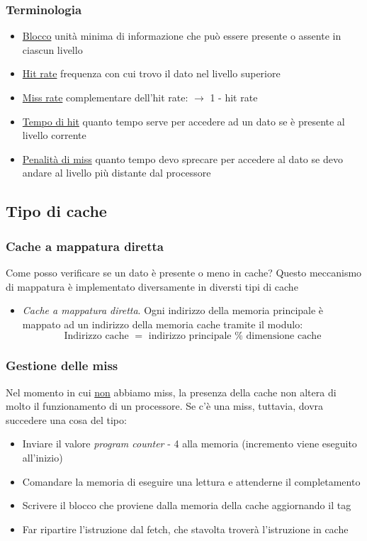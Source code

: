 \subsubsection*{Terminologia}
\begin{itemize}
	\item \underline{Blocco} unità minima di informazione che può essere presente o assente in ciascun livello
	\item \underline{Hit rate} frequenza con cui trovo il dato nel livello superiore
	\item \underline{Miss rate} complementare dell'hit rate: $ \rightarrow  $ 1 - hit rate
	\item \underline{Tempo di hit} quanto tempo serve per accedere ad un dato se è presente al livello corrente
	\item \underline{Penalità di miss} quanto tempo devo sprecare per accedere al dato se devo andare al livello più distante dal processore
\end{itemize}
\subsection{Tipo di cache}
\subsubsection*{Cache a mappatura diretta}
Come posso verificare se un dato è presente o meno in cache? Questo meccanismo di mappatura è implementato diversamente in diversti tipi di cache
\begin{itemize}
	\item \textit{Cache a mappatura diretta}. Ogni indirizzo della memoria principale è mappato ad un indirizzo della memoria cache tramite il modulo:
	      \[
		      \text{ Indirizzo cache } = \text{ indirizzo principale } \%  \text{ dimensione cache }
	      \]
\end{itemize}
\subsubsection*{Gestione delle miss}
Nel momento in cui \underline{non} abbiamo miss, la presenza della cache non altera di molto il funzionamento di un processore. Se c'è una miss, tuttavia, dovra succedere una cosa del tipo:
\begin{itemize}
	\item Inviare il valore \textit{program counter} - 4 alla memoria (incremento viene eseguito all'inizio)
	\item Comandare la memoria di eseguire una lettura e attenderne il completamento
	\item Scrivere il blocco che proviene dalla memoria della cache aggiornando il tag
	\item Far ripartire l'istruzione dal fetch, che stavolta troverà l'istruzione in cache
\end{itemize}

